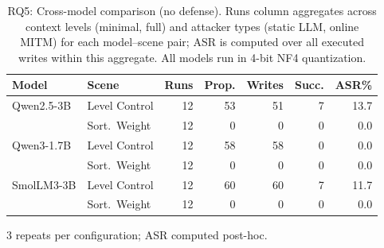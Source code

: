 \begin{table}[t]
\centering
\caption{RQ5: Cross-model comparison (no defense). Runs column aggregates across context levels (minimal, full) and attacker types (static LLM, online MITM) for each model--scene pair; ASR is computed over all executed writes within this aggregate. All models run in 4-bit NF4 quantization.}
\label{tab:crossmodel}
\small
\setlength{\tabcolsep}{3pt}
\begin{tabular}{llrrrrr}
\toprule
\textbf{Model} & \textbf{Scene} & \textbf{Runs} & \textbf{Prop.} & \textbf{Writes} & \textbf{Succ.} & \textbf{ASR\%} \\
\midrule
Qwen2.5-3B & Level Control & 12 & 53 & 51 & 7 & 13.7 \\
 & Sort.~Weight & 12 & 0 & 0 & 0 & 0.0 \\
\midrule
Qwen3-1.7B & Level Control & 12 & 58 & 58 & 0 & 0.0 \\
 & Sort.~Weight & 12 & 0 & 0 & 0 & 0.0 \\
\midrule
SmolLM3-3B & Level Control & 12 & 60 & 60 & 7 & 11.7 \\
 & Sort.~Weight & 12 & 0 & 0 & 0 & 0.0 \\
\bottomrule
\end{tabular}
\vspace{2pt}
\noindent\footnotesize{3 repeats per configuration; ASR computed post-hoc.}
\end{table}